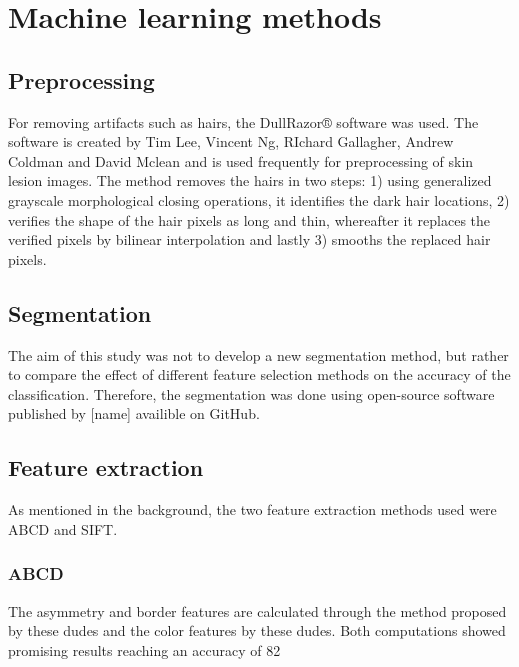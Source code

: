 \documentclass{kththesis}
\begin{document}
\section{Machine learning methods}

\subsection{Preprocessing}

For removing artifacts such as hairs, the DullRazor® software was used. The software is created by Tim Lee, Vincent Ng, RIchard Gallagher, Andrew Coldman and David Mclean and is used frequently for preprocessing of skin lesion images. The method removes the hairs in two steps: 1) using generalized grayscale morphological closing operations, it identifies the dark hair locations, 2) verifies the shape of the hair pixels as long and thin, whereafter it replaces the verified pixels by bilinear interpolation and lastly 3) smooths the replaced hair pixels. %


\subsection{Segmentation}

The aim of this study was not to develop a new segmentation method, but rather to compare the effect of different feature selection methods on the accuracy of the classification. Therefore, the segmentation was done using open-source software published by [name] availible on GitHub.

\subsection{Feature extraction}

As mentioned in the background, the two feature extraction methods used were ABCD and SIFT.

\subsubsection{ABCD}

The asymmetry and border features are calculated through the method proposed by these dudes and the color features by these dudes. Both computations showed promising results reaching an accuracy of 82%
\end{document}
